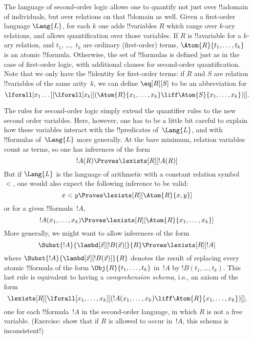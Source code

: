 \documentclass[../../../include/open-logic-section]{subfiles}
\begin{document}

The language of second-order logic allows one to quantify not just
over !!a{domain} of individuals, but over relations on that
!!{domain} as well. Given a first-order language $\Lang{L}$, for each
$k$ one adds !!{variable}s $R$ which range over $k$-ary relations, and
allows quantification over those variables. If $R$ is !!a{variable} for a
$k$-ary relation, and $t_1$, \dots,~$t_k$ are ordinary (first-order) terms,
$\Atom{R}{t_1,\dots,t_k}$ is an atomic !!{formula}. Otherwise, the set of
!!{formula}s is defined just as in the case of first-order logic, with
additional clauses for second-order quantification. Note that we only
have the !!{identity} for first-order terms: if $R$ and $S$ are relation
!!{variable}s of the same arity~$k$, we can define $\eq[R][S]$ to be an
abbreviation for
\[
\lforall[x_1 \dots][\lforall[x_k][(\Atom{R}{x_1, \dots, x_k} \liff
  \Atom{S}{x_1, \dots, x_k})]].
\]

The rules for second-order logic simply extend the quantifier rules to
the new second order variables. Here, however, one has to be a little
bit careful to explain how these variables interact with the !!{predicate}s
of~$\Lang{L}$, and with !!{formula}s of~$\Lang{L}$ more generally. At the bare
minimum, relation variables count as terms, so one has inferences of
the form
\[
!A(R) \Proves \lexists[R][!A(R)]
\]
But if $\Lang{L}$ is the language of arithmetic with a constant
relation symbol~$<$, one would also expect the following inference to
be valid:
\[
x < y \Proves \lexists[R][\Atom{R}{x,y}]
\]
or for a given !!{formula}~$!A$,
\[
!A(x_1, \dots, x_k) \Proves \lexists[R][\Atom{R}{x_1,\dots,x_k}]
\]
More generally, we might want to allow inferences of the form
\[
\Subst{!A}{\lambd[\vec x][!B(\vec x)]}{R} \Proves
\lexists[R][!A]
\]
where $\Subst{!A}{\lambd[\vec x][!B(\vec x)]}{R}$ denotes the result
of replacing every atomic !!{formula} of the form
$\Obj{R}{t_1,\dots,t_k}$ in~$!A$ by $!B(t_1, \dots, t_k)$. This last
rule is equivalent to having a {\em comprehension schema}, i.e., an
axiom of the form
\[
\lexists[R][\lforall[x_1, \dots, x_k][(!A(x_1, \dots, x_k) \liff
\Atom{R}{x_1, \dots, x_k})]],
\]
one for each !!{formula}~$!A$ in the second-order language, in which
$R$ is not a free variable. (Exercise: show that if $R$ is allowed to
occur in~$!A$, this schema is inconsistent!)
\end{document}
